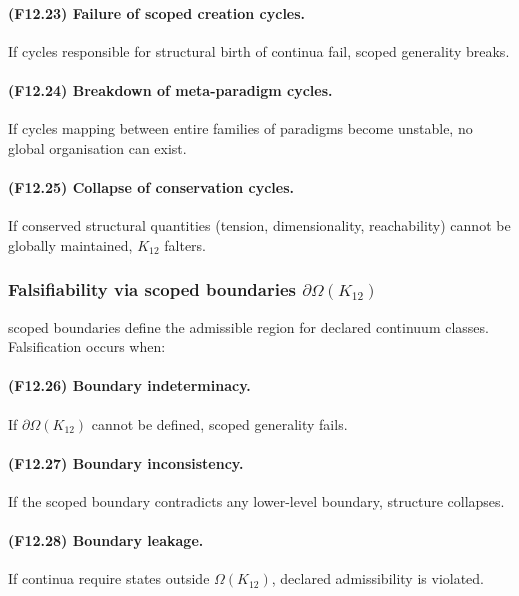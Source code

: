 \paragraph{(F12.23) Failure of scoped creation cycles.}
If cycles responsible for structural birth of continua fail,
scoped generality breaks.

\paragraph{(F12.24) Breakdown of meta-paradigm cycles.}
If cycles mapping between entire families of paradigms become unstable,
no global organisation can exist.

\paragraph{(F12.25) Collapse of conservation cycles.}
If conserved structural quantities (tension, dimensionality, reachability)
cannot be globally maintained, $K_{12}$ falters.



\subsubsection{Falsifiability via scoped boundaries $\partial\Omega(K_{12})$}

scoped boundaries define the admissible region for declared continuum classes.
Falsification occurs when:

\paragraph{(F12.26) Boundary indeterminacy.}
If $\partial\Omega(K_{12})$ cannot be defined, scoped generality fails.

\paragraph{(F12.27) Boundary inconsistency.}
If the scoped boundary contradicts any lower-level boundary,
structure collapses.

\paragraph{(F12.28) Boundary leakage.}
If continua require states outside $\Omega(K_{12})$,
declared admissibility is violated.


